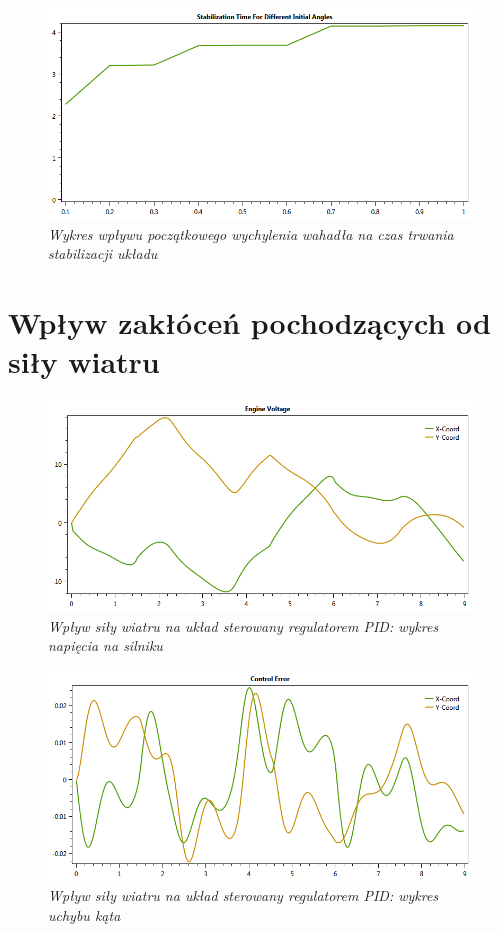 \documentclass[12pt, oneside]{report}
\theoremstyle{definition}
\begin{document}
\begin{figure}[H]
	\centering
		\includegraphics[width = 320pt]{PendulumAngleQuality} 
		\caption{\textit{Wykres wpływu początkowego wychylenia wahadła na czas trwania stabilizacji układu}}
		\label{plot:PendulumAngleQuality}
\end{figure}


\section{Wpływ zakłóceń pochodzących od siły wiatru}

\begin{figure}[H]
	\centering
		\includegraphics[width = 320pt]{WindPIDEV} 
		\caption{\textit{Wpływ siły wiatru na układ sterowany regulatorem PID: wykres napięcia na silniku}}
		\label{plot:WindPIDEV}
\end{figure}

\begin{figure}[H]
	\centering
		\includegraphics[width = 320pt]{WindPIDCEA} 
		\caption{\textit{Wpływ siły wiatru na układ sterowany regulatorem PID: wykres uchybu kąta}}
		\label{plot:WindPIDCEA}
\end{figure}
\end{document}
